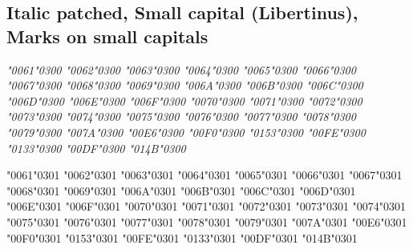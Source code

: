 \newpage
\subsection*{Italic patched, Small capital (Libertinus), Marks on small capitals}

{\LibertinusSerifPatch\itshape
\textsc{\char"0061\char"0300} \textsc{\char"0062\char"0300} \textsc{\char"0063\char"0300} \textsc{\char"0064\char"0300} \textsc{\char"0065\char"0300} \textsc{\char"0066\char"0300} \textsc{\char"0067\char"0300} \textsc{\char"0068\char"0300} \textsc{\char"0069\char"0300} \textsc{\char"006A\char"0300} \textsc{\char"006B\char"0300} \textsc{\char"006C\char"0300} \textsc{\char"006D\char"0300} \textsc{\char"006E\char"0300} \textsc{\char"006F\char"0300} \textsc{\char"0070\char"0300} \textsc{\char"0071\char"0300} \textsc{\char"0072\char"0300} \textsc{\char"0073\char"0300} \textsc{\char"0074\char"0300} \textsc{\char"0075\char"0300} \textsc{\char"0076\char"0300} \textsc{\char"0077\char"0300} \textsc{\char"0078\char"0300} \textsc{\char"0079\char"0300} \textsc{\char"007A\char"0300} \textsc{\char"00E6\char"0300} \textsc{\char"00F0\char"0300} \textsc{\char"0153\char"0300} \textsc{\char"00FE\char"0300} \textsc{\char"0133\char"0300} \textsc{\char"00DF\char"0300} \textsc{\char"014B\char"0300}

\textsc{\char"0061\char"0301} \textsc{\char"0062\char"0301} \textsc{\char"0063\char"0301} \textsc{\char"0064\char"0301} \textsc{\char"0065\char"0301} \textsc{\char"0066\char"0301} \textsc{\char"0067\char"0301} \textsc{\char"0068\char"0301} \textsc{\char"0069\char"0301} \textsc{\char"006A\char"0301} \textsc{\char"006B\char"0301} \textsc{\char"006C\char"0301} \textsc{\char"006D\char"0301} \textsc{\char"006E\char"0301} \textsc{\char"006F\char"0301} \textsc{\char"0070\char"0301} \textsc{\char"0071\char"0301} \textsc{\char"0072\char"0301} \textsc{\char"0073\char"0301} \textsc{\char"0074\char"0301} \textsc{\char"0075\char"0301} \textsc{\char"0076\char"0301} \textsc{\char"0077\char"0301} \textsc{\char"0078\char"0301} \textsc{\char"0079\char"0301} \textsc{\char"007A\char"0301} \textsc{\char"00E6\char"0301} \textsc{\char"00F0\char"0301} \textsc{\char"0153\char"0301} \textsc{\char"00FE\char"0301} \textsc{\char"0133\char"0301} \textsc{\char"00DF\char"0301} \textsc{\char"014B\char"0301}

}
